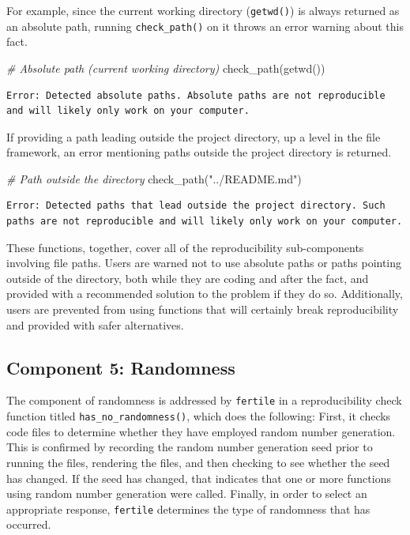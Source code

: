 \documentclass[12pt,twoside]{reedthesis}
\newenvironment{Shaded}{\begin{snugshade}}{\end{snugshade}}
\newcommand{\CommentTok}[1]{\textcolor[rgb]{0.56,0.35,0.01}{\textit{#1}}}
\newcommand{\FunctionTok}[1]{\textcolor[rgb]{0.00,0.00,0.00}{#1}}
\newcommand{\NormalTok}[1]{#1}
\newcommand{\StringTok}[1]{\textcolor[rgb]{0.31,0.60,0.02}{#1}}
\begin{document}
For example, since the current working directory (\texttt{getwd()}) is always returned as an absolute path, running \texttt{check\_path()} on it throws an error warning about this fact.
\begin{Shaded}
\begin{Highlighting}[]
\CommentTok{\# Absolute path (current working directory)}
\FunctionTok{check\_path}\NormalTok{(}\FunctionTok{getwd}\NormalTok{())}
\end{Highlighting}
\end{Shaded}
\begin{verbatim}
Error: Detected absolute paths. Absolute paths are not reproducible
and will likely only work on your computer.
\end{verbatim}
If providing a path leading outside the project directory, up a level in the file framework, an error mentioning paths outside the project directory is returned.
\begin{Shaded}
\begin{Highlighting}[]
\CommentTok{\# Path outside the directory}
\FunctionTok{check\_path}\NormalTok{(}\StringTok{"../README.md"}\NormalTok{)}
\end{Highlighting}
\end{Shaded}
\begin{verbatim}
Error: Detected paths that lead outside the project directory. Such
paths are not reproducible and will likely only work on your computer.
\end{verbatim}
These functions, together, cover all of the reproducibility sub-components involving file paths. Users are warned not to use absolute paths or paths pointing outside of the directory, both while they are coding and after the fact, and provided with a recommended solution to the problem if they do so. Additionally, users are prevented from using functions that will certainly break reproducibility and provided with safer alternatives.

\hypertarget{component-5-randomness}{%
\subsection{Component 5: Randomness}\label{component-5-randomness}}

The component of randomness is addressed by \texttt{fertile} in a reproducibility check function titled \texttt{has\_no\_randomness()}, which does the following: First, it checks code files to determine whether they have employed random number generation. This is confirmed by recording the random number generation seed prior to running the files, rendering the files, and then checking to see whether the seed has changed. If the seed has changed, that indicates that one or more functions using random number generation were called. Finally, in order to select an appropriate response, \texttt{fertile} determines the type of randomness that has occurred.
\end{document}
